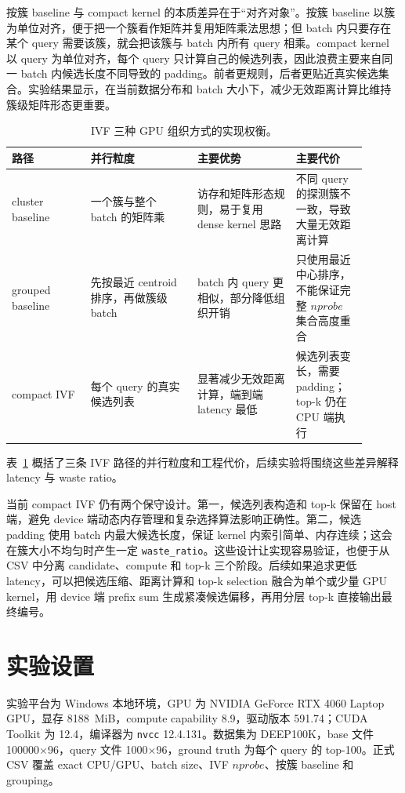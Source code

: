 \documentclass[10pt,a4paper]{article}
\begin{document}
按簇 baseline 与 compact kernel 的本质差异在于“对齐对象”。按簇 baseline 以簇为单位对齐，便于把一个簇看作矩阵并复用矩阵乘法思想；但 batch 内只要存在某个 query 需要该簇，就会把该簇与 batch 内所有 query 相乘。compact kernel 以 query 为单位对齐，每个 query 只计算自己的候选列表，因此浪费主要来自同一 batch 内候选长度不同导致的 padding。前者更规则，后者更贴近真实候选集合。实验结果显示，在当前数据分布和 batch 大小下，减少无效距离计算比维持簇级矩阵形态更重要。

\begin{table}[H]
\centering
\small
\caption{IVF 三种 GPU 组织方式的实现权衡。}
\label{tab:ivf-organization}
\begin{tabular}{p{0.20\linewidth}p{0.27\linewidth}p{0.25\linewidth}p{0.18\linewidth}}
\toprule
路径 & 并行粒度 & 主要优势 & 主要代价 \\
\midrule
cluster baseline & 一个簇与整个 batch 的矩阵乘 & 访存和矩阵形态规则，易于复用 dense kernel 思路 & 不同 query 的探测簇不一致，导致大量无效距离计算 \\
grouped baseline & 先按最近 centroid 排序，再做簇级 batch & batch 内 query 更相似，部分降低组织开销 & 只使用最近中心排序，不能保证完整 $nprobe$ 集合高度重合 \\
compact IVF & 每个 query 的真实候选列表 & 显著减少无效距离计算，端到端 latency 最低 & 候选列表变长，需要 padding；top-k 仍在 CPU 端执行 \\
\bottomrule
\end{tabular}
\end{table}
表~\ref{tab:ivf-organization} 概括了三条 IVF 路径的并行粒度和工程代价，后续实验将围绕这些差异解释 latency 与 waste ratio。

当前 compact IVF 仍有两个保守设计。第一，候选列表构造和 top-k 保留在 host 端，避免 device 端动态内存管理和复杂选择算法影响正确性。第二，候选 padding 使用 batch 内最大候选长度，保证 kernel 内索引简单、内存连续；这会在簇大小不均匀时产生一定 \texttt{waste\_ratio}。这些设计让实现容易验证，也便于从 CSV 中分离 candidate、compute 和 top-k 三个阶段。后续如果追求更低 latency，可以把候选压缩、距离计算和 top-k selection 融合为单个或少量 GPU kernel，用 device 端 prefix sum 生成紧凑候选偏移，再用分层 top-k 直接输出最终编号。

\section{实验设置}

实验平台为 Windows 本地环境，GPU 为 NVIDIA GeForce RTX 4060 Laptop GPU，显存 8188~MiB，compute capability 8.9，驱动版本 591.74；CUDA Toolkit 为 12.4，编译器为 \texttt{nvcc} 12.4.131。数据集为 DEEP100K，base 文件 100000$\times$96，query 文件 1000$\times$96，ground truth 为每个 query 的 top-100。正式 CSV 覆盖 exact CPU/GPU、batch size、IVF $nprobe$、按簇 baseline 和 grouping。
\end{document}
